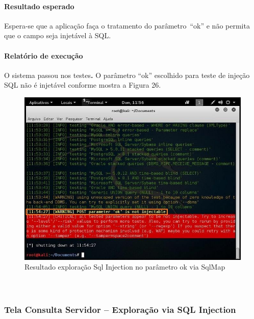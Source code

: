 \documentclass[
    12pt,               %
    openright,          %
    oneside,            %
    a4paper,            %
    section=TITLE,     %
    english,            %
    french,             %
    spanish,            %
    brazil              %
    ]{abntex2}
\begin{document}
\paragraph*{Resultado esperado}

Espera-se que a aplicação faça o tratamento do parâmetro~\textquotedblleft{}ok\textquotedblright{} e não permita que o campo seja injetável à SQL.



\paragraph*{Relatório de execução}

O sistema passou nos testes\textbf{. }O parâmetro \textquotedblleft{}ok\textquotedblright{} escolhido para teste de injeção SQL não é injetável conforme mostra a Figura 26.





\begin{figure}[htp]
\centering
\caption{Resultado exploração Sql Injection no parâmetro ok via SqlMap}
\includegraphics[width=450px]{image22.jpeg}
\end{figure}
\ifdefined\FloatBarrier \FloatBarrier \fi



\paragraph*{~}


\subsubsection*{Tela Consulta Servidor -- Exploração via SQL Injection}
\end{document}

